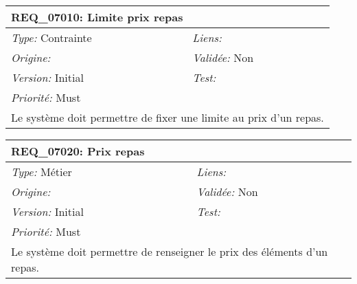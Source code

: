 \begin{table}[!h]

\begin{tabular}{|p{60mm}p{100mm}|}

\hline

\multicolumn{2}{|l|}{\textbf{REQ\_07010:} Limite prix repas} \\ \hline

\emph{Type:} Contrainte & \emph{Liens:}  \\

\emph{Origine:}  & \emph{Validée:} Non \\

\emph{Version:} Initial & \emph{Test:}  \\

\emph{Priorité:} Must & \\ \hline

\multicolumn{2}{|p{16cm}|}{Le système doit permettre de fixer une limite au prix d'un repas.} \\ \hline

\end{tabular}

\end{table}



\begin{table}[!h]

\begin{tabular}{|p{60mm}p{100mm}|}

\hline

\multicolumn{2}{|l|}{\textbf{REQ\_07020:} Prix repas} \\ \hline

\emph{Type:} Métier & \emph{Liens:}  \\

\emph{Origine:}  & \emph{Validée:} Non \\

\emph{Version:} Initial & \emph{Test:}  \\

\emph{Priorité:} Must & \\ \hline

\multicolumn{2}{|p{16cm}|}{Le système doit permettre de renseigner le prix des éléments d'un repas.} \\ \hline

\end{tabular}

\end{table}



